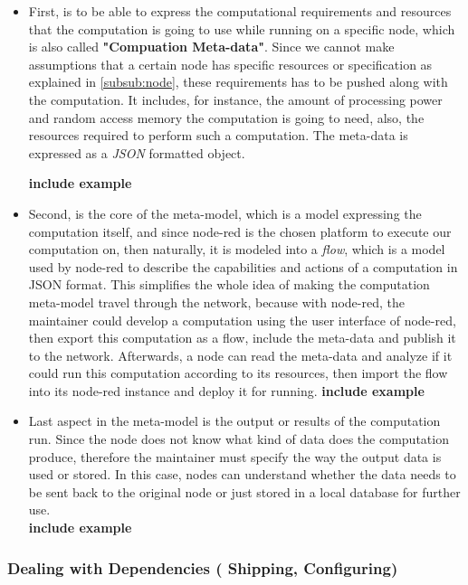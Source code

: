 \begin{itemize}
	
	\item First, is to be able to express the computational requirements and resources that the computation is going to use while running on a specific node, which is also called \textbf{"Compuation Meta-data"}. Since we cannot make assumptions that a certain node has specific resources or specification as explained in \ref{subsub:node}, these requirements has to be pushed along with the computation. It includes, for instance, the amount of processing power and random access memory the computation is going to need, also, the resources required to perform such a computation.
	The meta-data is expressed as a \textit{JSON} formatted object.
	
	\textbf{include example}
	
	\item Second, is the core of the meta-model, which is a model expressing the computation itself, and since node-red is the chosen platform to execute our computation on, then naturally, it is modeled into a \textit{flow}, which is a model used by node-red to describe the capabilities and actions of a computation in JSON format. This simplifies the whole idea of making the computation meta-model travel through the network, because with node-red, the maintainer could develop a computation using the user interface of node-red, then export this computation as a flow, include the meta-data and publish it to the network. Afterwards, a node can read the meta-data and analyze if it could run this computation according to its resources, then import the flow into its node-red instance and deploy it for running.
	\textbf{include example}
	
	\item Last aspect in the meta-model is the output or results of the computation run. Since the node does not know what kind of data does the computation produce, therefore the maintainer must specify the way the output data is used or stored. In this case, nodes can understand whether the data needs to be sent back to the original node or just stored in a local database for further use. \\
	\textbf{include example}
\end{itemize}

\subsubsection{Dealing with Dependencies ( Shipping, Configuring)}
